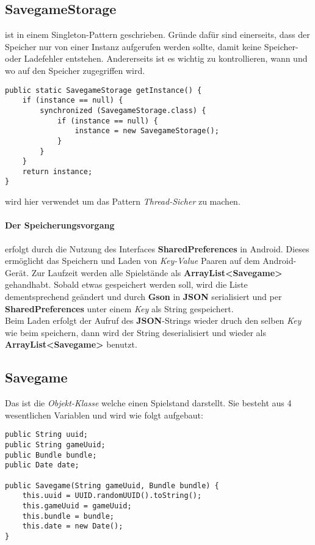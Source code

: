 \subsection{SavegameStorage}
ist in einem Singleton-Pattern geschrieben. Gründe dafür sind einerseits, dass 
der Speicher nur von einer Instanz aufgerufen werden sollte, damit keine 
Speicher- oder Ladefehler entstehen. Andererseits ist es wichtig zu kontrollieren, 
wann und wo auf den Speicher zugegriffen wird. 
\begin{lstlisting}[caption={SavegameStorage Singleton},captionpos=b]
public static SavegameStorage getInstance() {
	if (instance == null) {
		synchronized (SavegameStorage.class) {
			if (instance == null) {
				instance = new SavegameStorage();
			}
		}
	}
	return instance;
}
\end{lstlisting}
 wird hier verwendet um das Pattern \emph{Thread-Sicher} zu 
machen.

\paragraph{Der Speicherungsvorgang} erfolgt durch die Nutzung des Interfaces  
\textbf{SharedPreferences} in Android. Dieses ermöglicht das Speichern und Laden von 
\emph{Key-Value} Paaren auf dem Android-Gerät. Zur Laufzeit werden alle Spielstände 
als \textbf{ArrayList\textless Savegame\textgreater} gehandhabt. Sobald etwas 
gespeichert werden soll, wird die Liste dementsprechend geändert und durch 
\textbf{Gson} in \textbf{JSON} serialisiert und per \textbf{SharedPreferences} 
unter einem \emph{Key} als String gespeichert.\\
Beim Laden erfolgt der Aufruf des \textbf{JSON}-Strings wieder druch den selben 
\emph{Key} wie beim speichern, dann wird der String deserialisiert und wieder als 
\textbf{ArrayList\textless Savegame\textgreater} benutzt.

\subsection{Savegame}
Das ist die \emph{Objekt-Klasse} welche einen Spielstand darstellt. Sie besteht 
aus 4 wesentlichen Variablen und wird wie folgt aufgebaut:
\begin{lstlisting}[caption={Savegame Variablen \& Konstruktor},captionpos=b]
public String uuid;
public String gameUuid;
public Bundle bundle;
public Date date;

public Savegame(String gameUuid, Bundle bundle) {
	this.uuid = UUID.randomUUID().toString();
	this.gameUuid = gameUuid;
	this.bundle = bundle;
	this.date = new Date();
}
\end{lstlisting}

